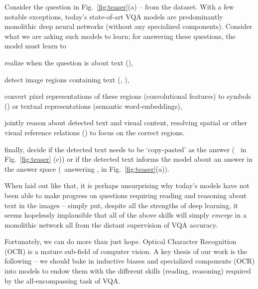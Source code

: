 \documentclass[10pt,twocolumn,letterpaper]{article}
\begin{document}
Consider the question in Fig.~\ref{fig:teaser}(a) -- 
 from the \datasetName dataset. 
With a few notable exceptions, today's state-of-art VQA models are predominantly 
monolithic deep neural networks (without any specialized components). 
Consider what we are asking such models to learn; for answering these questions, the model must learn to 
\begin{compactitem}
    \item realize when the question is about text (), 
    \item detect image regions containing text (, ),
    \item convert pixel representations of these regions 
    (convolutional features) to symbols () or 
    textual representations (semantic word-embeddings), 
    \item jointly reason about detected text and visual content, \eg 
    resolving spatial or other visual reference relations 
    () to focus on the correct regions.
    \item finally, decide if the detected text needs to be  `copy-pasted' as the answer (\eg~ in Fig.~\ref{fig:teaser} (c))
    or if the detected text informs the model about an answer in the 
    answer space (\eg~answering , in Fig.~\ref{fig:teaser}(a)).
\end{compactitem}

When laid out like that, it is perhaps unsurprising why today's models have not been able to make progress on questions requiring reading and reasoning about text in the images -- simply put, despite all the strengths 
of deep learning, it seems hopelessly implausible that all 
of the above skills will simply \emph{emerge} in a 
monolithic network all from the distant supervision of VQA accuracy. 

Fortunately, we can do more than just hope. 
Optical Character Recognition (OCR) is a mature 
sub-field of computer vision. A key thesis of our work 
is the following --  we should bake in 
inductive biases and specialized 
components (\eg OCR) into models to endow them with the different 
skills (\eg reading, reasoning) required by the all-encompassing task of VQA. 
\end{document}
